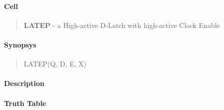 \label{LATEP}
\paragraph{Cell}
\begin{quote}
    \textbf{LATEP} - a High-active D-Latch with high-active Clock Enable
\end{quote}

\paragraph{Synopsys}
\begin{quote}
    LATEP(Q, D, E, X)
\end{quote}

\paragraph{Description}

%

\paragraph{Truth Table}
%

